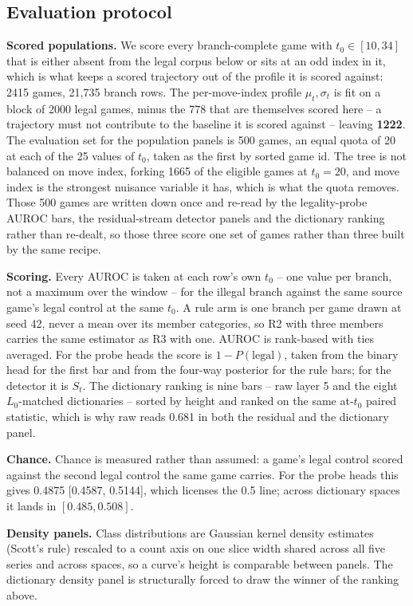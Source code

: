 \documentclass{article}
\begin{document}
\subsection{Evaluation protocol}

\textbf{Scored populations.} We score every branch-complete game with $t_0 \in [10, 34]$ that is
either absent from the legal corpus below or sits at an odd index in it, which is what keeps a
scored trajectory out of the profile it is scored against: 2415 games, 21,735 branch rows. The
per-move-index profile $\mu_t, \sigma_t$ is fit on a block of 2000 legal games, minus the 778
that are themselves scored here -- a trajectory must not contribute to the baseline it is scored
against -- leaving \textbf{1222}. The evaluation set for the population panels is 500 games, an
equal quota of 20 at each of the 25 values of $t_0$, taken as the first by sorted game id. The
tree is not balanced on move index, forking 1665 of the eligible games at $t_0 = 20$, and move
index is the strongest nuisance variable it has, which is what the quota removes. Those 500 games
are written down once and re-read by the legality-probe AUROC bars, the residual-stream detector
panels and the dictionary ranking rather than re-dealt, so those three score one set of games
rather than three built by the same recipe.

\textbf{Scoring.} Every AUROC is taken at each row's own $t_0$ -- one value per branch, not a
maximum over the window -- for the illegal branch against the same source game's legal control at
the same $t_0$. A rule arm is one branch per game drawn at seed 42, never a mean over its member
categories, so R2 with three members carries the same estimator as R3 with one. AUROC is
rank-based with ties averaged. For the probe heads the score is $1 - P(\text{legal})$, taken from
the binary head for the first bar and from the four-way posterior for the rule bars; for the
detector it is $S_t$. The dictionary ranking is nine bars -- raw layer 5 and the eight
$L_0$-matched dictionaries -- sorted by height and ranked on the same at-$t_0$ paired statistic,
which is why raw reads 0.681 in both the residual and the dictionary panel.

\textbf{Chance.} Chance is measured rather than assumed: a game's legal control scored against
the second legal control the same game carries. For the probe heads this gives 0.4875 [0.4587,
0.5144], which licenses the 0.5 line; across dictionary spaces it lands in $[0.485, 0.508]$.

\textbf{Density panels.} Class distributions are Gaussian kernel density estimates (Scott's rule)
rescaled to a count axis on one slice width shared across all five series and across spaces, so a
curve's height is comparable between panels. The dictionary density panel is structurally forced
to draw the winner of the ranking above.
\end{document}
